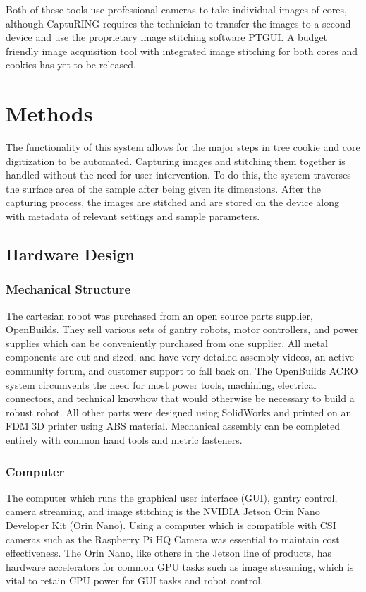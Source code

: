\documentclass[a4paper,12pt]{article}
\begin{document}
Both of these tools use professional cameras to take individual images of cores, although CaptuRING requires the technician to transfer the images to a second device and use the proprietary image stitching software PTGUI. 
A budget friendly image acquisition tool with integrated image stitching for both cores and cookies has yet to be released.   

\section{Methods}
The functionality of this system allows for the major steps in tree cookie and core digitization to be automated. Capturing images and stitching them together is handled without the need for user intervention. 
To do this, the system traverses the surface area of the sample after being given its dimensions. After the capturing process, the images are stitched and are stored on the device along with metadata of relevant 
settings and sample parameters.

\subsection{Hardware Design}

\subsubsection{Mechanical Structure}
The cartesian robot was purchased from an open source parts supplier, OpenBuilds. They sell various sets of gantry robots, motor controllers, and power supplies
which can be conveniently purchased from one supplier. All metal components are cut and sized, and have very detailed assembly videos, an active community forum,
and customer support to fall back on. The OpenBuilds ACRO system circumvents the need for most power tools, machining, electrical connectors, and technical knowhow that would otherwise be necessary to build a robust robot.
All other parts were designed using SolidWorks and printed on an FDM 3D printer using ABS material. Mechanical assembly can be completed entirely with common hand tools and metric fasteners. 

\subsubsection{Computer}
The computer which runs the graphical user interface (GUI), gantry control, camera streaming, and image stitching is the NVIDIA Jetson Orin Nano Developer Kit (Orin Nano). Using a computer
which is compatible with CSI cameras such as the Raspberry Pi HQ Camera was essential to maintain cost effectiveness. The Orin Nano, like others in the Jetson line of products, has hardware
accelerators for common GPU tasks such as image streaming, which is vital to retain CPU power for GUI tasks and robot control. 
\end{document}
